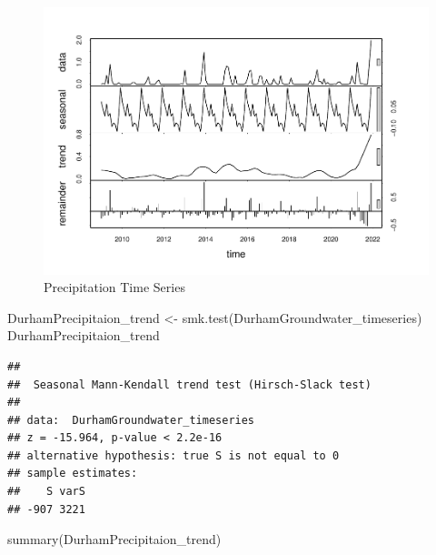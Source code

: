 \documentclass[
  12pt,
]{article}
\newenvironment{Shaded}{\begin{snugshade}}{\end{snugshade}}
\newcommand{\FunctionTok}[1]{\textcolor[rgb]{0.00,0.00,0.00}{#1}}
\newcommand{\NormalTok}[1]{#1}
\newcommand{\OtherTok}[1]{\textcolor[rgb]{0.56,0.35,0.01}{#1}}
\begin{document}
\begin{figure}
\centering
\includegraphics{Project_files/figure-latex/time-series analysis on precipitation-1.pdf}
\caption{Precipitation Time Series}
\end{figure}

\begin{Shaded}
\begin{Highlighting}[]
\NormalTok{DurhamPrecipitaion\_trend }\OtherTok{\textless{}{-}} \FunctionTok{smk.test}\NormalTok{(DurhamGroundwater\_timeseries)}
\NormalTok{DurhamPrecipitaion\_trend}
\end{Highlighting}
\end{Shaded}

\begin{verbatim}
## 
##  Seasonal Mann-Kendall trend test (Hirsch-Slack test)
## 
## data:  DurhamGroundwater_timeseries
## z = -15.964, p-value < 2.2e-16
## alternative hypothesis: true S is not equal to 0
## sample estimates:
##    S varS 
## -907 3221
\end{verbatim}

\begin{Shaded}
\begin{Highlighting}[]
\FunctionTok{summary}\NormalTok{(DurhamPrecipitaion\_trend)}
\end{Highlighting}
\end{Shaded}
\end{document}
